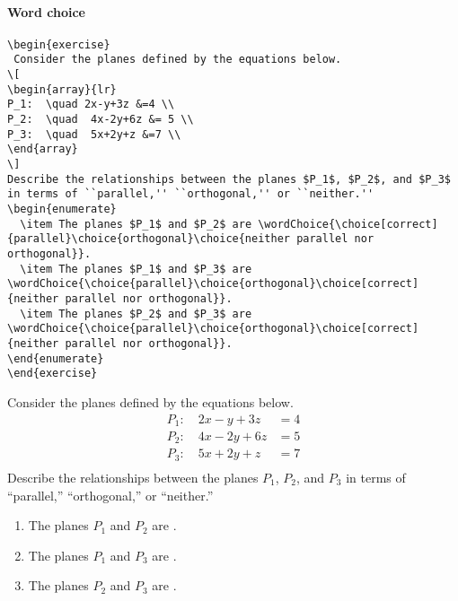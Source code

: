 \documentclass{ximera}
\begin{document}
\paragraph{Word choice}
\begin{verbatim}
\begin{exercise}
 Consider the planes defined by the equations below.
\[
\begin{array}{lr}
P_1:  \quad 2x-y+3z &=4 \\
P_2:  \quad  4x-2y+6z &= 5 \\
P_3:  \quad  5x+2y+z &=7 \\
\end{array}
\]
Describe the relationships between the planes $P_1$, $P_2$, and $P_3$ in terms of ``parallel,'' ``orthogonal,'' or ``neither.''
\begin{enumerate}
  \item The planes $P_1$ and $P_2$ are \wordChoice{\choice[correct]{parallel}\choice{orthogonal}\choice{neither parallel nor orthogonal}}.
  \item The planes $P_1$ and $P_3$ are \wordChoice{\choice{parallel}\choice{orthogonal}\choice[correct]{neither parallel nor orthogonal}}.
  \item The planes $P_2$ and $P_3$ are \wordChoice{\choice{parallel}\choice{orthogonal}\choice[correct]{neither parallel nor orthogonal}}.
\end{enumerate}
\end{exercise}
\end{verbatim}


\begin{exercise}
  Consider the planes defined by the equations below.
\[
\begin{array}{lr}
P_1:  \quad 2x-y+3z &=4 \\
P_2:  \quad  4x-2y+6z &= 5 \\
P_3:  \quad  5x+2y+z &=7 \\
\end{array}
\]
 Describe the relationships between the planes $P_1$, $P_2$, and $P_3$ in terms of ``parallel,'' ``orthogonal,'' or ``neither.''
 \begin{enumerate}
   \item The planes $P_1$ and $P_2$ are .
   \item The planes $P_1$ and $P_3$ are .
   \item The planes $P_2$ and $P_3$ are .
 \end{enumerate}
 \end{exercise}
\end{document}
